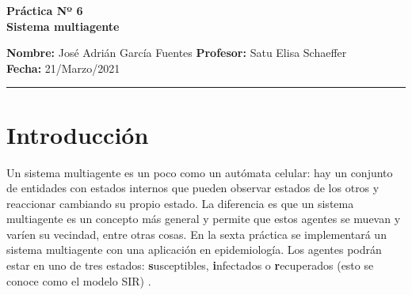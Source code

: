 \documentclass[a4paper]{article}
\begin{document}
\begin{center} %
\large \bf Práctica Nº 6   %
\\ %
Sistema multiagente
\end{center} %
\textbf{Nombre:}   %
José Adrián García Fuentes
\hfill  %
\textbf{Profesor:}   %
Satu Elisa Schaeffer \hfill
\\
\textbf{Fecha:} 21/Marzo/2021        %
\\
\hrule    %
\medskip
 \section{Introducción}
\justify Un sistema multiagente es un poco como un autómata celular: hay un conjunto de entidades con estados internos que pueden observar estados de los otros y reaccionar cambiando su propio estado. La diferencia es que un sistema multiagente es un concepto más general y permite que estos agentes se muevan y varíen su vecindad, entre otras cosas. En la sexta práctica se implementará un sistema multiagente con una aplicación en epidemiología. Los agentes podrán estar en uno de tres estados: \textbf{s}usceptibles, \textbf{i}nfectados o \textbf{r}ecuperados (esto se conoce como el modelo SIR) \cite{p5}.
\end{document}
